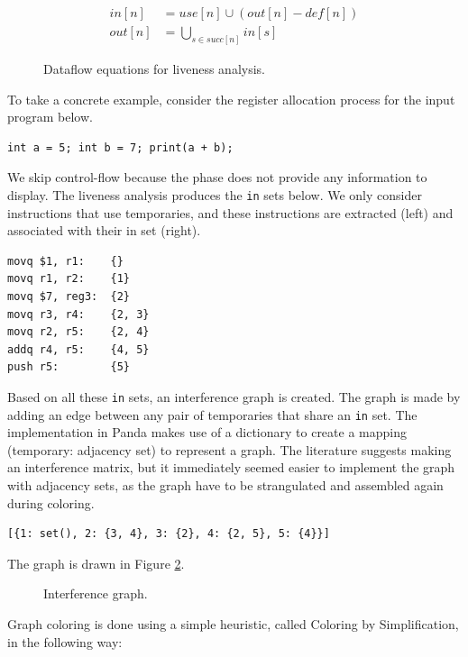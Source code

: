 \begin{figure}[H]
    \begin{align*}
        in[n] &= use[n] \cup (out[n] - def[n])\\
        out[n] &= \bigcup\limits_{s \in succ[n]} in[s]
    \end{align*}
    \caption{Dataflow equations for liveness analysis.}
    \label{fig:dataflow-eq}
\end{figure}

To take a concrete example, consider the register allocation process for the input program below.

\begin{verbatim}
int a = 5; int b = 7; print(a + b);
\end{verbatim}

We skip control-flow because the phase does not provide any information to display. The liveness analysis produces the \texttt{in} sets below. We only consider instructions that use temporaries, and these instructions are extracted (left) and associated with their in set (right).

\begin{verbatim}
movq $1, r1:    {}
movq r1, r2:    {1}   
movq $7, reg3:  {2}   
movq r3, r4:    {2, 3}
movq r2, r5:    {2, 4}
addq r4, r5:    {4, 5}
push r5:        {5}
\end{verbatim}

Based on all these \texttt{in} sets, an interference graph is created. The graph is made by adding an edge between any pair of temporaries that share an \texttt{in} set. The implementation in Panda makes use of a dictionary to create a mapping (temporary: adjacency set) to represent a graph. The literature suggests making an interference matrix, but it immediately seemed easier to implement the graph with adjacency sets, as the graph have to be strangulated and assembled again during coloring.

\begin{verbatim}
[{1: set(), 2: {3, 4}, 3: {2}, 4: {2, 5}, 5: {4}}]
\end{verbatim}

The graph is drawn in Figure \ref{fig:interference-graph}.

\begin{figure}[H]
    \centering
    
    \caption{Interference graph.}
    \label{fig:interference-graph}
\end{figure}

Graph coloring is done using a simple heuristic, called Coloring by Simplification, in the following way:

